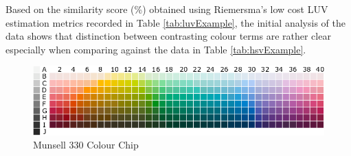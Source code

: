 Based on the similarity score (\%) obtained using Riemersma's low cost LUV estimation metrics recorded in Table \ref{tab:luvExample}, the initial analysis of the data shows that distinction between contrasting colour terms are rather clear especially when comparing against the data in Table \ref{tab:hsvExample}. 




\begin{figure}[hbt!]\centering
\includegraphics[width=.9\textwidth]{image/analysis/munsell_o.png}
\caption{Munsell 330 Colour Chip}
\label{fig:munsell_ori330}
\end{figure}


